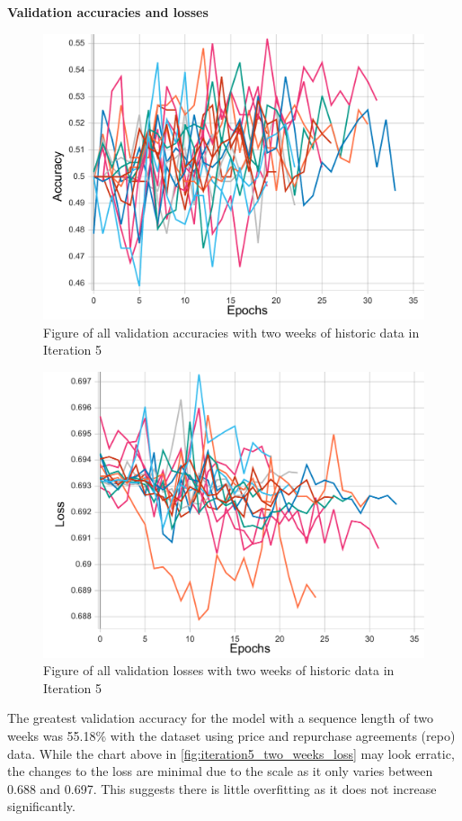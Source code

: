 \pagebreak
\textbf{Validation accuracies and losses}
\begin{figure}[ht]
    \centering
    \includegraphics[width=0.575\columnwidth]{figures/results/final/two_weeks_acc.pdf}
    \caption[Validation accuracies for Iteration 5 with two weeks of historic data]{Figure of all validation accuracies with two weeks of historic data in Iteration 5}
    \label{fig:iteration5_two_weeks_accuracy}
\end{figure}
\FloatBarrier

\begin{figure}[ht]
    \centering
    \includegraphics[width=0.575\columnwidth]{figures/results/final/two_weeks_loss.pdf}
    \caption[Validation losses for Iteration 5 with two weeks of historic data]{Figure of all validation losses with two weeks of historic data in Iteration 5}
    \label{fig:iteration5_two_weeks_loss}
\end{figure}
\FloatBarrier

The greatest validation accuracy for the model with a sequence length of two weeks was 55.18\% with the dataset using price and repurchase
agreements (repo) data.
While the chart above in \autoref{fig:iteration5_two_weeks_loss} may look erratic, the changes to the loss are minimal due to the scale as it only varies
between 0.688 and 0.697. This suggests there is little overfitting as it does not increase significantly.

